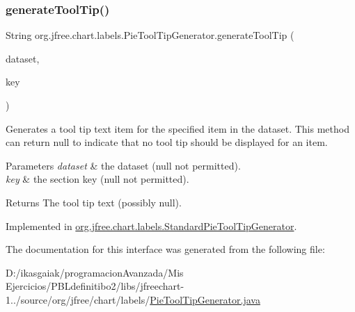 \subsubsection{\texorpdfstring{generate\+Tool\+Tip()}{generateToolTip()}}
{\footnotesize\ttfamily String org.\+jfree.\+chart.\+labels.\+Pie\+Tool\+Tip\+Generator.\+generate\+Tool\+Tip (\begin{DoxyParamCaption}\item[{\mbox{\hyperlink{interfaceorg_1_1jfree_1_1data_1_1general_1_1_pie_dataset}{Pie\+Dataset}}}]{dataset,  }\item[{Comparable}]{key }\end{DoxyParamCaption})}

Generates a tool tip text item for the specified item in the dataset. This method can return {\ttfamily null} to indicate that no tool tip should be displayed for an item.


\begin{DoxyParams}{Parameters}
{\em dataset} & the dataset ({\ttfamily null} not permitted). \\
\hline
{\em key} & the section key ({\ttfamily null} not permitted).\\
\hline
\end{DoxyParams}
\begin{DoxyReturn}{Returns}
The tool tip text (possibly {\ttfamily null}). 
\end{DoxyReturn}


Implemented in \mbox{\hyperlink{classorg_1_1jfree_1_1chart_1_1labels_1_1_standard_pie_tool_tip_generator_a59dfcce924c57515c68bf382da8306c9}{org.\+jfree.\+chart.\+labels.\+Standard\+Pie\+Tool\+Tip\+Generator}}.



The documentation for this interface was generated from the following file\+:\begin{DoxyCompactItemize}
\item 
D\+:/ikasgaiak/programacion\+Avanzada/\+Mis Ejercicios/\+P\+B\+Ldefinitibo2/libs/jfreechart-\/1../source/org/jfree/chart/labels/\mbox{\hyperlink{_pie_tool_tip_generator_8java}{Pie\+Tool\+Tip\+Generator.\+java}}\end{DoxyCompactItemize}
